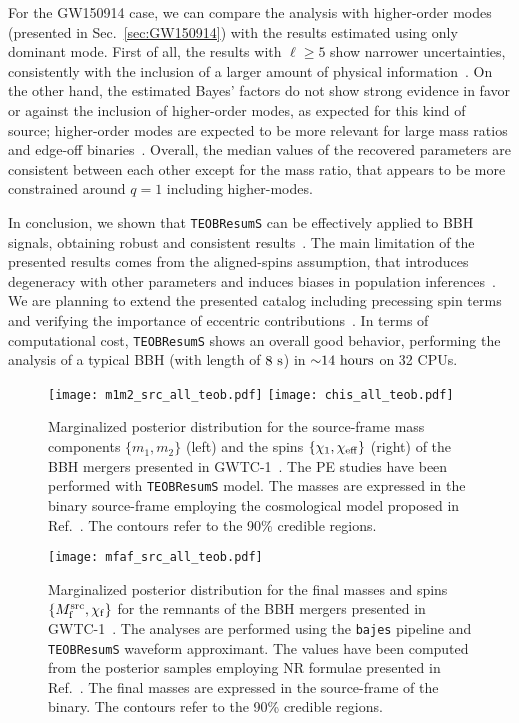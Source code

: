 \documentclass[prd,aps,twocolumn,a4paper,showkeys,nofootinbib,floatfix]{revtex4-1}
\newcommand{\bajes}{{\tt bajes}}
\begin{document}
For the GW150914 case, 
we can compare the analysis with higher-order modes (presented in Sec.~\ref{sec:GW150914}) with the results estimated using only dominant mode.
First of all, the results with $\ell \ge 5$ show narrower uncertainties,
consistently with the inclusion of a larger amount of physical information~\cite{Bustillo:2016gid,Breschi:2019wki,Mills:2020thr}.
On the other hand, the estimated Bayes' factors do not show
strong evidence in favor or against the inclusion of higher-order modes,
as expected for this kind of source;
higher-order modes are expected to be more
relevant for large mass ratios and edge-off
 binaries~\cite{Varma:2014jxa,Bustillo:2015ova}.
Overall, the median values of the recovered
parameters are consistent between each other
except for the mass ratio, that appears to be more constrained around $q=1$ 
including higher-modes.

In conclusion,
we shown that {\tt TEOBResumS} can be effectively applied to 
BBH signals, obtaining robust and consistent results~\cite{Nagar:2018zoe}.
The main limitation of the presented results comes from the aligned-spins
assumption, that introduces degeneracy with other parameters and 
induces biases in population inferences~\cite{Stevenson:2017dlk,Farr:2017uvj,Tiwari:2018qch}.
We are planning to extend the presented catalog
including precessing spin terms~\cite{Akcay:2020qrj} 
and verifying the importance of eccentric contributions~\cite{Chiaramello:2020ehz}.
In terms of computational cost, 
{\tt TEOBResumS} shows an overall good behavior,
performing the analysis of a typical BBH (with length of $8~{\rm s}$) 
in ${\sim} 14~{\rm hours}$ on 32 CPUs.

\begin{figure*}[t]
	\centering 
	\texttt{[image: m1m2\_src\_all\_teob.pdf]}
		\texttt{[image: chis\_all\_teob.pdf]}
	\caption{Marginalized posterior distribution for the source-frame mass components $\{m_1,m_2\}$ (left)
		and the spins $\{\chi_{1},\chi_{\rm eff}\}$ (right)
					of the BBH mergers presented in GWTC-1~\cite{LIGOScientific:2018mvr}.
										The PE studies have been
					performed with {\tt TEOBResumS} model.
					The masses are expressed in the binary source-frame 
					employing the cosmological model proposed in Ref.~\cite{Aghanim:2018eyx}.
					The contours refer to the 90\% credible regions.}
	\label{fig:m1m2_s1s2}
\end{figure*}

\begin{figure}[t]
	\centering 
	\texttt{[image: mfaf\_src\_all\_teob.pdf]}
	\caption{Marginalized posterior distribution for the final
		masses and spins $\{M_{\rm f}^{\rm src},\chi_{\rm f}\}$ 
		for the remnants of the BBH mergers presented in GWTC-1~\cite{LIGOScientific:2018mvr}.
		The analyses are performed using the {\bajes} pipeline
		and {\tt TEOBResumS} waveform approximant.
		The values have been computed from the posterior samples 
		employing NR formulae presented in Ref.~\cite{Jimenez-Forteza:2016oae}.
		The final masses are expressed in the source-frame of the binary.
		The contours refer to the 90\% credible regions.}
	\label{fig:mfsf}
\end{figure}
\end{document}
